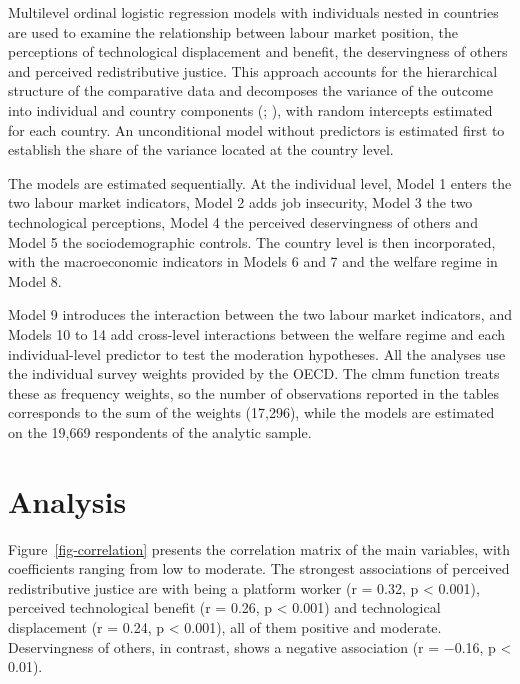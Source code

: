 \documentclass[
  12pt,
]{article}
\begin{document}
Multilevel ordinal logistic regression models with individuals nested in
countries are used to examine the relationship between labour market
position, the perceptions of technological displacement and benefit, the
deservingness of others and perceived redistributive justice. This
approach accounts for the hierarchical structure of the comparative data
and decomposes the variance of the outcome into individual and country
components (;
),
with random intercepts estimated for each country. An unconditional
model without predictors is estimated first to establish the share of
the variance located at the country level.

The models are estimated sequentially. At the individual level, Model 1
enters the two labour market indicators, Model 2 adds job insecurity,
Model 3 the two technological perceptions, Model 4 the perceived
deservingness of others and Model 5 the sociodemographic controls. The
country level is then incorporated, with the macroeconomic indicators in
Models 6 and 7 and the welfare regime in Model 8.

Model 9 introduces the interaction between the two labour market
indicators, and Models 10 to 14 add cross-level interactions between the
welfare regime and each individual-level predictor to test the
moderation hypotheses. All the analyses use the individual survey
weights provided by the OECD. The clmm function treats these as
frequency weights, so the number of observations reported in the tables
corresponds to the sum of the weights (17,296), while the models are
estimated on the 19,669 respondents of the analytic sample.

\section{Analysis}\label{analysis}



Figure~\ref{fig-correlation} presents the correlation matrix of the main
variables, with coefficients ranging from low to moderate. The strongest
associations of perceived redistributive justice are with being a
platform worker (r = 0.32, p \textless{} 0.001), perceived technological
benefit (r = 0.26, p \textless{} 0.001) and technological displacement
(r = 0.24, p \textless{} 0.001), all of them positive and moderate.
Deservingness of others, in contrast, shows a negative association (r =
−0.16, p \textless{} 0.01).
\end{document}
